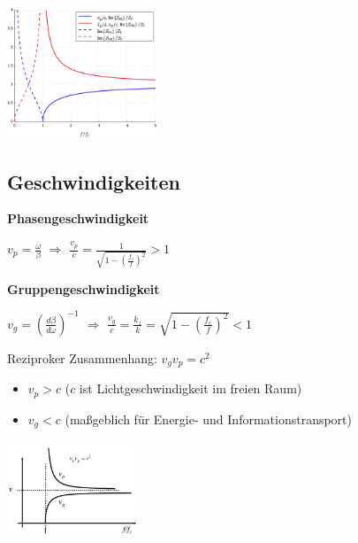 \documentclass[english]{latex4ei/latex4ei_sheet}
\begin{document}
\begin{sectionbox}
\begin{center}\includegraphics[width = 4.5cm]{./img/hl-widerstand.png}\end{center}
\end{sectionbox}

\begin{sectionbox}
	\subsection{Geschwindigkeiten}
	\textbf{Phasengeschwindigkeit}
	\begin{emphbox}
		$v_{p}=\frac{\omega}{\beta}$ $\Rightarrow$ $\frac{v_p}{c} = \frac{1}{\sqrt{1 - \left(\frac{f_c}{f}\right)^2}} > 1$\\
	\end{emphbox}


	\textbf{Gruppengeschwindigkeit}
	\begin{emphbox}
		$v_{g}= \left(\frac{d \beta}{d \omega}\right)^{-1}$ $\Rightarrow$ $\frac{v_g}{c} = \frac{k_z}{k} = \sqrt{1-\left(\frac{f_c}{f}\right)^2} < 1$\\
	\end{emphbox}
	Reziproker Zusammenhang: $v_g v_p = c^2$\\

	\begin{itemize}
		\item $v_p > c$ ($c$ ist Lichtgeschwindigkeit im freien Raum)
		\item $v_g < c$ (maßgeblich für Energie- und Informationstransport)
	\end{itemize}
	\begin{center}\includegraphics[width = 4cm]{./img/geschwindigkeiten.png}\end{center}
\end{sectionbox}
\end{document}
